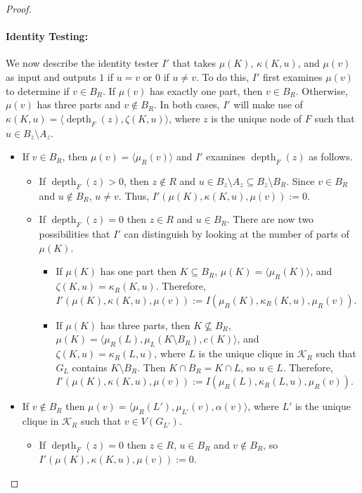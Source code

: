\documentclass{patmorin}
\DeclareMathOperator{\depth}{depth}
\begin{document}
\begin{proof}
  \paragraph{Identity Testing:}
  We now describe the identity tester $I'$ that takes $\mu(K)$, $\kappa(K,u)$, and $\mu(v)$ as input and outputs $1$ if $u=v$ or $0$ if $u\neq v$.  To do this, $I'$ first examines $\mu(v)$ to determine if $v\in B_R$.  If $\mu(v)$ has exactly one part, then $v\in B_R$. Otherwise, $\mu(v)$ has three parts and $v\not\in B_R$.
  In both cases, $I'$ will make use of $\kappa(K,u)=\langle\depth_F(z),\zeta(K,u)\rangle$, where $z$ is the unique node of $F$ such that $u\in B_z\setminus A_z$.
  \begin{itemize}
    \item If $v\in B_R$, then $\mu(v)=\langle\mu_R(v)\rangle$ and $I'$ examines  $\depth_F(z)$ as follows.
    \begin{itemize}
      \item If $\depth_F(z)> 0$, then $z\not\in R$ and $u\in B_z\setminus A_z\subseteq B_z\setminus B_R$.  Since $v\in B_R$ and $u\not\in B_R$, $u\neq v$.  Thus, $I'(\mu(K),\kappa(K,u),\mu(v)):=0$.

      \item If $\depth_F(z)=0$ then $z\in R$ and $u\in B_R$.   There are now two possibilities that $I'$ can distinguish by looking at the number of parts of $\mu(K)$.
      \begin{itemize}
        \item If $\mu(K)$ has one part then $K\subseteq B_R$,  $\mu(K)=\langle \mu_R(K)\rangle$, and $\zeta(K,u)=\kappa_R(K,u)$.  Therefore, $I'(\mu(K),\kappa(K,u),\mu(v)):=I(\mu_R(K),\kappa_R(K,u),\mu_R(v))$.
        \item If $\mu(K)$ has three parts, then $K\not\subseteq B_R$, $\mu(K)=\langle \mu_R(L),\mu_L(K\setminus B_R),c(K)\rangle$, and  $\zeta(K,u)=\kappa_R(L,u)$, where $L$ is the unique clique in $\mathcal{K}_R$ such that $G_L$ contains $K\setminus B_R$.  Then $K\cap B_R=K\cap L$, so $u\in L$. Therefore, $I'(\mu(K),\kappa(K,u),\mu(v)):=I(\mu_R(L),\kappa_R(L,u),\mu_R(v))$.
      \end{itemize}
    \end{itemize}
    \item If $v\not\in B_R$ then $\mu(v)=\langle \mu_R(L'),\mu_{L'}(v),\alpha(v)\rangle$, where $L'$ is the unique clique in $\mathcal{K}_R$ such that $v\in V(G_{L'})$.
    \begin{itemize}
      \item If $\depth_F(z)=0$ then $z\in R$, $u\in B_R$ and $v\not\in B_R$, so $I'(\mu(K),\kappa(K,u),\mu(v)):=0$.


\end{itemize}
\end{itemize}
\end{proof}
\end{document}
